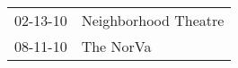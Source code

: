 \begin{supertabular}{p{0.07\textwidth}p{0.23\textwidth}}
 02-13-10 &  Neighborhood Theatre \\
 08-11-10 &             The NorVa \\
\end{supertabular}
